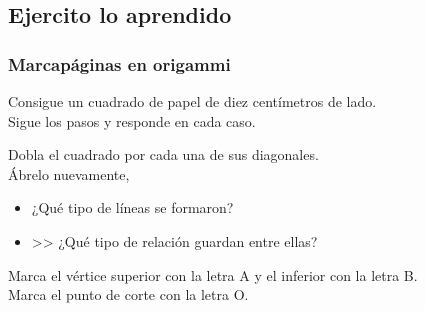 \documentclass[10pt,twoside]{article}
\begin{document}
\subsection*{Ejercito lo aprendido}
\subsubsection*{Marcapáginas en origammi}
Consigue un cuadrado de papel de diez centímetros de lado.\\
Sigue los pasos y responde en cada caso.
\begin{minipage}{.35\textwidth}
\end{minipage}
\begin{minipage}{.6\textwidth}
Dobla el cuadrado por cada una de sus diagonales.\\
Ábrelo nuevamente,
\begin{itemize}
\item ¿Qué tipo de líneas se formaron?
\item >> ¿Qué tipo de relación guardan entre ellas?
\end{itemize}
Marca el vértice superior con la letra A y el inferior con la
letra B.\\
Marca el punto de corte con la letra O.
\end{minipage}
\end{document}
